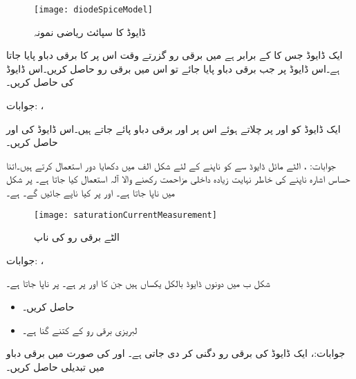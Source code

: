 \begin{figure}
\centering
\texttt{[image: diodeSpiceModel]}
\caption{ڈایوڈ کا سپائث ریاضی نمونہ}
\label{شکل_ڈایوڈ_کا_سپائث_ماڈل}
\end{figure}
\newpage
{}
ایک ڈایوڈ جس کا  کے برابر ہے میں  برقی رو گزرتے وقت اس پر  کا برقی دباو پایا جاتا ہے۔اس ڈایوڈ پر جب  برقی دباو پایا جائے تو اس میں برقی رو حاصل کریں۔اس ڈایوڈ کی  حاصل کریں۔

جوابات: ،   

ایک ڈایوڈ کو  اور  پر چلاتے ہوئے اس پر  اور  برقی دباو پائے جاتے ہیں۔اس ڈایوڈ کی  اور  حاصل کریں۔

جوابات: ، 
الٹے مائل ڈایوڈ سے  کو ناپنے کے لئے شکل  الف میں دکھایا دور استعمال کرتے ہیں۔اتنا حساس اشارہ ناپنے کی خاطر نہایت زیادہ داخلی مزاحمت رکھنے والا آلہ استعمال کیا جاتا ہے۔ پر شکل میں  ناپا جاتا ہے۔ اور  پر کیا ناپے جائیں گے۔ ہے۔
\begin{figure}
\centering
\texttt{[image: saturationCurrentMeasurement]}
\caption{الٹے برقی رو کی ناپ}
\label{شکل_سوال_الٹے_برقی_رو_ناپ}
\end{figure}

جوابات: ، 

شکل   ب میں دونوں ڈایوڈ بالکل یکساں ہیں جن کا  اور   پر  ہے۔ پر  ناپا جاتا ہے۔
\begin{itemize}
\item
{} حاصل کریں۔
\item
{} لبریزی برقی رو  کے کتنے گنا ہے۔
\end{itemize}
جوابات:، 
ایک ڈایوڈ کی برقی رو دگنی کر دی جاتی ہے۔ اور  کی صورت میں برقی دباو میں تبدیلی حاصل کریں۔

